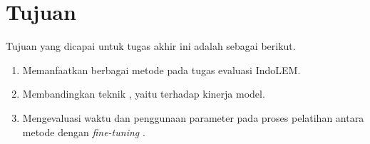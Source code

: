 \section{Tujuan}
\label{sec:tujuan}

Tujuan yang  dicapai untuk tugas akhir ini adalah sebagai berikut.

\begin{enumerate}
    \item Memanfaatkan berbagai metode \PEFT pada tugas evaluasi IndoLEM.
    \item Membandingkan teknik \PEFT, yaitu \methodPEFT terhadap kinerja model.
    \item Mengevaluasi waktu dan penggunaan parameter pada proses pelatihan antara metode \PEFT dengan \textit{fine-tuning} .
\end{enumerate}
